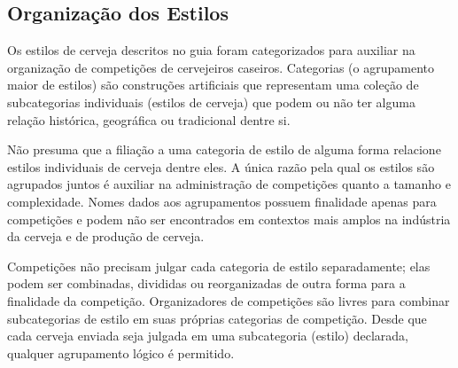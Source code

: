 \subsection*{Organização dos Estilos}
Os estilos de cerveja descritos no guia foram categorizados para auxiliar na organização de competições de cervejeiros caseiros. Categorias (o agrupamento maior de estilos) são construções artificiais que representam uma coleção de subcategorias individuais (estilos de cerveja) que podem ou não ter alguma relação histórica, geográfica ou tradicional dentre si.

Não presuma que a filiação a uma categoria de estilo de alguma forma relacione estilos individuais de cerveja dentre eles. A única razão pela qual os estilos são agrupados juntos é auxiliar na administração de competições quanto a tamanho e complexidade. Nomes dados aos agrupamentos possuem finalidade apenas para competições e podem não ser encontrados em contextos mais amplos na indústria da cerveja e de produção de cerveja.

Competições não precisam julgar cada categoria de estilo separadamente; elas podem ser combinadas, divididas ou reorganizadas de outra forma para a finalidade da competição. Organizadores de competições são livres para combinar subcategorias de estilo em suas próprias categorias de competição. Desde que cada cerveja enviada seja julgada em uma subcategoria (estilo) declarada, qualquer agrupamento lógico é permitido.
